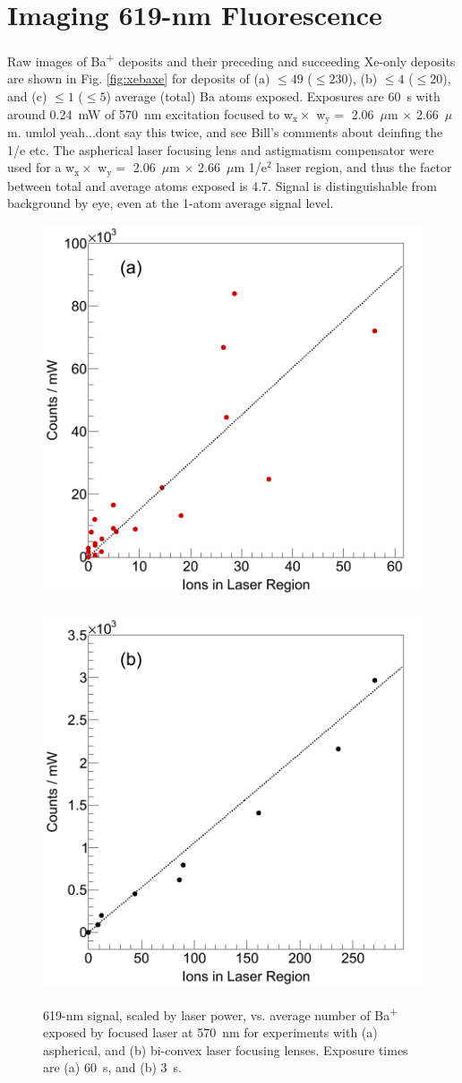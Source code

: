 \section{Imaging 619-nm Fluorescence}
\label{sec:imaging619}

Raw images of Ba\textsuperscript{+} deposits and their preceding and succeeding Xe-only deposits are shown in Fig. \ref{fig:xebaxe} for deposits of (a) $\leq 49$ ($\leq 230$), (b) $\leq 4$ ($\leq 20$), and (c) $\leq 1$ ($\leq 5$) average (total) Ba atoms exposed.  Exposures are 60~s with around 0.24~mW of 570~nm excitation focused to w$_{\text{x}} \times$ w$_{\text{y}} =$ 2.06~$\mu$m $\times$ 2.66~$\mu$m. {\color{red}umlol yeah...dont say this twice, and see Bill's comments about deinfing the 1/e etc.} The aspherical laser focusing lens and astigmatism compensator were used for a w$_{\text{x}} \times$ w$_{\text{y}} =$ 2.06~$\mu$m $\times$ 2.66~$\mu$m 1/e$^{2}$ laser region, and thus the factor between total and average atoms exposed is 4.7.  Signal is distinguishable from background by eye, even at the 1-atom average signal level.


\begin{figure} %
        \centering
                \includegraphics[width=.5\textwidth]{figures/lin_just20150807_lin.png}
                ~
                \includegraphics[width=.5\textwidth]{figures/lin_just20150526_lin.png}
                \caption{619-nm signal, scaled by laser power, vs. average number of Ba\textsuperscript{+} exposed by focused laser at 570~nm for experiments with (a) aspherical, and (b) bi-convex laser focusing lenses.  Exposure times are (a) 60~s, and (b) 3~s.}
\label{fig:lin}
\end{figure}

